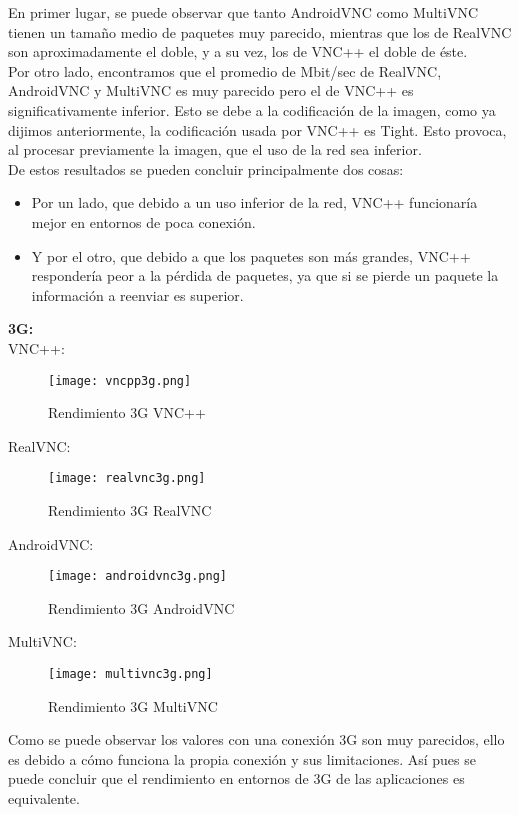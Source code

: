 En primer lugar, se puede observar que tanto AndroidVNC como MultiVNC tienen un tamaño medio de paquetes muy parecido, mientras que los de RealVNC son aproximadamente el doble, y a su vez, los de VNC++ el doble de éste.\\

Por otro lado, encontramos que el promedio de Mbit/sec de RealVNC, AndroidVNC y MultiVNC es muy parecido pero el de VNC++ es significativamente inferior. Esto se debe a la codificación de la imagen, como ya dijimos anteriormente, la codificación usada por VNC++ es Tight. Esto provoca, al procesar previamente la imagen, que el uso de la red sea inferior.\\

De estos resultados se pueden concluir principalmente dos cosas:
\begin{itemize}
\item Por un lado, que debido a un uso inferior de la red, VNC++ funcionaría mejor en entornos de poca conexión.
\item Y por el otro, que debido a que los paquetes son más grandes, VNC++ respondería peor a la pérdida de paquetes, ya que si se pierde un paquete la información a reenviar es superior.
\end{itemize}
\newpage
\textbf{3G:}\\

VNC++:
\begin{figure}[h]
\begin{flushleft}
\texttt{[image: vncpp3g.png]}
\end{flushleft}
\caption{Rendimiento 3G VNC++}
\end{figure}

RealVNC:
\begin{figure}[h]
\begin{flushleft}
\texttt{[image: realvnc3g.png]}
\end{flushleft}
\caption{Rendimiento 3G RealVNC}
\end{figure}

AndroidVNC:
\begin{figure}[h]
\begin{flushleft}
\texttt{[image: androidvnc3g.png]}
\end{flushleft}
\caption{Rendimiento 3G AndroidVNC}
\end{figure}
\newpage
MultiVNC:
\begin{figure}[h]
\begin{flushleft}
\texttt{[image: multivnc3g.png]}
\end{flushleft}
\caption{Rendimiento 3G MultiVNC}
\end{figure}

Como se puede observar los valores con una conexión 3G son muy parecidos, ello es debido a cómo funciona la propia conexión y sus limitaciones. Así pues se puede concluir que el rendimiento en entornos de 3G de las aplicaciones es equivalente. 

